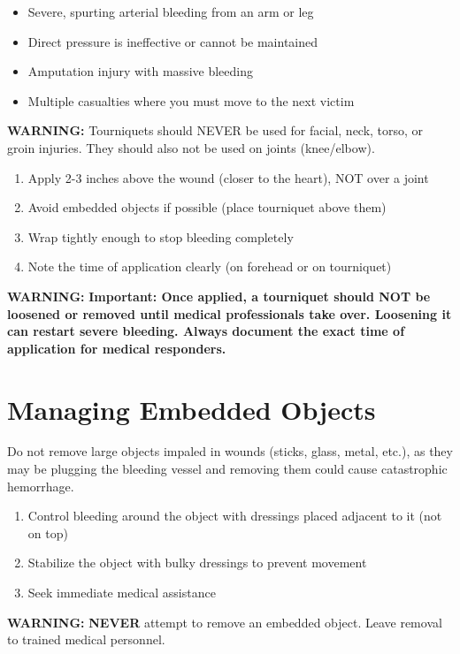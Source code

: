 \begin{itemize}[leftmargin=*]
  \item Severe, spurting arterial bleeding from an arm or leg
  \item Direct pressure is ineffective or cannot be maintained
  \item Amputation injury with massive bleeding
  \item Multiple casualties where you must move to the next victim
\end{itemize}

\textbf{WARNING:} Tourniquets should NEVER be used for facial, neck, torso, or groin injuries. They should also not be used on joints (knee/elbow).

\begin{enumerate}[leftmargin=*]
\item Apply 2-3 inches above the wound (closer to the heart), NOT over a joint
\item Avoid embedded objects if possible (place tourniquet above them)
\item Wrap tightly enough to stop bleeding completely
\item Note the time of application clearly (on forehead or on tourniquet)
\end{enumerate}
\textbf{WARNING:} \textbf{Important: Once applied, a tourniquet should NOT be loosened or removed until medical professionals take over. Loosening it can restart severe bleeding. Always document the exact time of application for medical responders.}

\section{Managing Embedded Objects}\label{sec:embedded_objects}

Do not remove large objects impaled in wounds (sticks, glass, metal, etc.), as they may be plugging the bleeding vessel and removing them could cause catastrophic hemorrhage.

\begin{enumerate}[leftmargin=*]
\item Control bleeding around the object with dressings placed adjacent to it (not on top)
\item Stabilize the object with bulky dressings to prevent movement
\item Seek immediate medical assistance
\end{enumerate}
\textbf{WARNING:} \textbf{NEVER} attempt to remove an embedded object. Leave removal to trained medical personnel.

